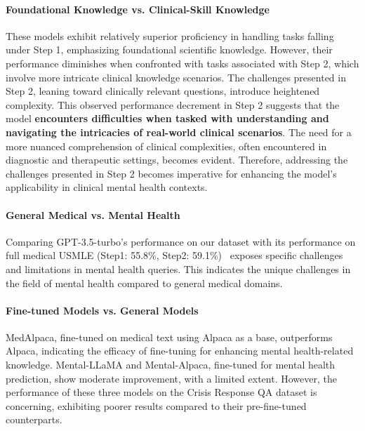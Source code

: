 \paragraph{Foundational Knowledge vs. Clinical-Skill Knowledge} These models exhibit relatively superior proficiency in handling tasks falling under Step 1, emphasizing foundational scientific knowledge. However, their performance diminishes when confronted with tasks associated with Step 2, which involve more intricate clinical knowledge scenarios. The challenges presented in Step 2, leaning toward clinically relevant questions, introduce heightened complexity. This observed performance decrement in Step 2 suggests that the model \textbf{encounters difficulties when tasked with understanding and navigating the intricacies of real-world clinical scenarios}. The need for a more nuanced comprehension of clinical complexities, often encountered in diagnostic and therapeutic settings, becomes evident. Therefore, addressing the challenges presented in Step 2 becomes imperative for enhancing the model's applicability in clinical mental health contexts.

\paragraph{General Medical vs. Mental Health} Comparing GPT-3.5-turbo's performance on our dataset with its performance on full medical USMLE (Step1: 55.8\%, Step2: 59.1\%)~\citep{kung2023performance} exposes specific challenges and limitations in mental health queries. This indicates the unique challenges in the field of mental health compared to general medical domains.

\paragraph{Fine-tuned Models vs. General Models} MedAlpaca, fine-tuned on medical text using Alpaca as a base, outperforms Alpaca, indicating the efficacy of fine-tuning for enhancing mental health-related knowledge. Mental-LLaMA and Mental-Alpaca, fine-tuned for mental health prediction, show moderate improvement, with a limited extent. However, the performance of these three models on the Crisis Response QA dataset is concerning, exhibiting poorer results compared to their pre-fine-tuned counterparts.

